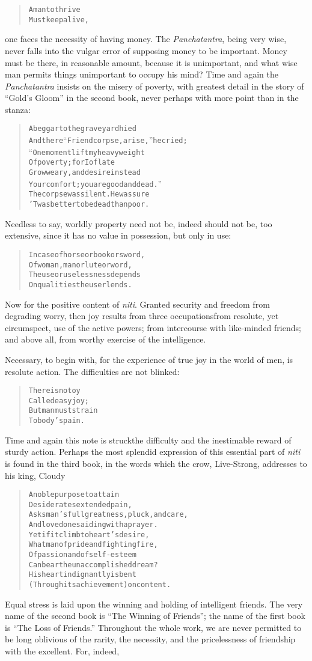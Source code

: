 \documentclass[article, twoside, 14pt]{memoir}
\renewenvironment{verbatim}{%
\begin{quote}%
\vskip -10pt%
\begin{alltt}\normalfont\large}{\end{alltt}%
\end{quote}%
\vskip -10pt
} %
\begin{document}
\begin{verbatim}
A man to thrive
Must keep alive,
\end{verbatim}
one faces the necessity of having money. The \emph{Panchatantra},
being very wise, never falls into the vulgar error of supposing
money to be important. Money must be there, in reasonable amount,
because it is unimportant, and what wise man permits things
unimportant to occupy his mind? Time and again the
\emph{Panchatantra} insists on the misery of poverty, with greatest
detail in the story of ``Gold's Gloom'' in the second book, never
perhaps with more point than in the stanza:

\begin{verbatim}
A beggar to the graveyard hied
And there “Friend corpse, arise,” he cried;
“One moment lift my heavy weight
Of poverty; for I of late
Grow weary, and desire instead
Your comfort; you are good and dead.”
The corpse was silent. He was sure
'Twas better to be dead than poor.
\end{verbatim}
Needless to say, worldly property need not be, indeed should not
be, too extensive, since it has no value in possession, but only in
use:

\begin{verbatim}
In case of horse or book or sword,
Of woman, man or lute or word,
The use or uselessness depends
On qualities the user lends.
\end{verbatim}
Now for the positive content of \emph{niti}. Granted security and
freedom from degrading worry, then joy results from three
occupations{\textemdash}from resolute, yet circumspect, use of the active
powers; from intercourse with like-minded friends; and above all,
from worthy exercise of the intelligence.

Necessary, to begin with, for the experience of true joy in the
world of men, is resolute action. The difficulties are not
blinked:

\begin{verbatim}
There is no toy
Called easy joy;
But man must strain
To body's pain.
\end{verbatim}
Time and again this note is struck{\textemdash}the difficulty and the
inestimable reward of sturdy action. Perhaps the most splendid
expression of this essential part of \emph{niti} is found in the
third book, in the words which the crow, Live-Strong, addresses to
his king, Cloudy

\begin{verbatim}
A noble purpose to attain
Desiderates extended pain,
Asks man's full greatness, pluck, and care,
And loved ones aiding with a prayer.
Yet if it climb to heart's desire,
What man of pride and fighting fire,
Of passion and of self-esteem
Can bear the unaccomplished dream?
His heart indignantly is bent
(Through its achievement) on content.
\end{verbatim}
Equal stress is laid upon the winning and holding of intelligent
friends. The very name of the second book is
``The Winning of Friends''; the name of the first book is
``The Loss of Friends.'' Throughout the whole work, we are never
permitted to be long oblivious of the rarity, the necessity, and
the pricelessness of friendship with the excellent. For, indeed,
\end{document}
